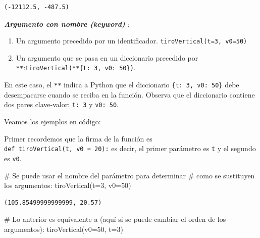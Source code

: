 \documentclass[
  spanish,
  letterpaper,
]{scrbook}
\newenvironment{Shaded}{\begin{snugshade}}{\end{snugshade}}
\newcommand{\CommentTok}[1]{\textcolor[rgb]{0.37,0.37,0.37}{#1}}
\newcommand{\DecValTok}[1]{\textcolor[rgb]{0.68,0.00,0.00}{#1}}
\newcommand{\NormalTok}[1]{\textcolor[rgb]{0.00,0.23,0.31}{#1}}
\newcommand{\OperatorTok}[1]{\textcolor[rgb]{0.37,0.37,0.37}{#1}}
\theoremstyle{definition}
\theoremstyle{remark}
\begin{document}
\begin{verbatim}
(-12112.5, -487.5)
\end{verbatim}

\textbf{\emph{Argumento con nombre (keyword)}} :

\begin{enumerate}
\def\labelenumi{\arabic{enumi}.}
\setcounter{enumi}{2}
\item
  Un argumento precedido por un identificador.
  \texttt{tiroVertical(t=3,\ v0=50)}
\item
  Un argumento que se pasa en un diccionario precedido por
  \texttt{**}:\texttt{tiroVertical(**\{\textquotesingle{}t\textquotesingle{}:\ 3,\ \textquotesingle{}v0\textquotesingle{}:\ 50\})}.
\end{enumerate}

En este caso, el \texttt{**} indica a Python que el diccionario
\texttt{\{\textquotesingle{}t\textquotesingle{}:\ 3,\ \textquotesingle{}v0\textquotesingle{}:\ 50\}}
debe desempacarse cuando se reciba en la función. Observa que el
diccionario contiene dos pares clave-valor:
\texttt{\textquotesingle{}t\textquotesingle{}:\ 3} y
\texttt{\textquotesingle{}v0\textquotesingle{}:\ 50}.

Veamos los ejemplos en código:

Primer recordemos que la firma de la función es
\texttt{def\ tiroVertical(t,\ v0\ =\ 20):} es decir, el primer parámetro
es \texttt{t} y el segundo es \texttt{v0}.

\begin{Shaded}
\begin{Highlighting}[]
\CommentTok{\# Se puede usar el nombre del parámetro para determinar}
\CommentTok{\# como se sustituyen los argumentos:}
\NormalTok{tiroVertical(t}\OperatorTok{=}\DecValTok{3}\NormalTok{, v0}\OperatorTok{=}\DecValTok{50}\NormalTok{)}
\end{Highlighting}
\end{Shaded}

\begin{verbatim}
(105.85499999999999, 20.57)
\end{verbatim}

\begin{Shaded}
\begin{Highlighting}[]
\CommentTok{\# Lo anterior es equivalente a (aquí si se puede cambiar el orden de los argumentos): }
\NormalTok{tiroVertical(v0}\OperatorTok{=}\DecValTok{50}\NormalTok{, t}\OperatorTok{=}\DecValTok{3}\NormalTok{)}
\end{Highlighting}
\end{Shaded}
\end{document}
